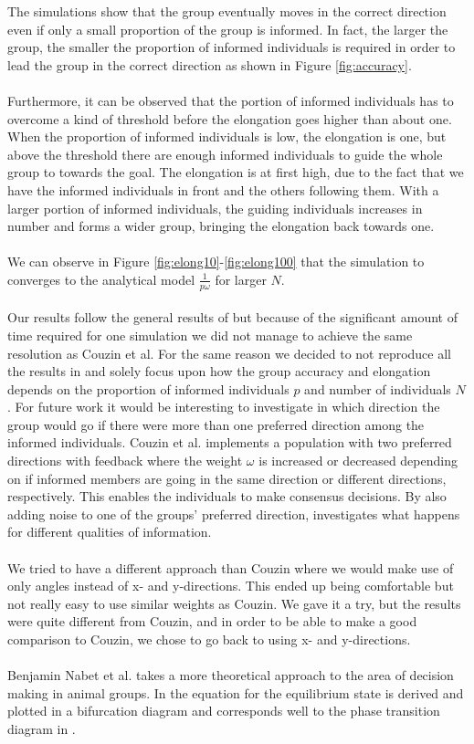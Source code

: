 The simulations show that the group eventually moves in the correct direction even if only a small proportion of the group is informed. 
In fact, the larger the group, the smaller the proportion of informed individuals is required in order to lead the group in the correct direction as shown in Figure \ref{fig:accuracy}.
\\\\
Furthermore, it can be observed that the portion of informed individuals has to overcome a kind of threshold before the elongation goes higher than about one. 
When the proportion of informed individuals is low, the elongation is one, but above the threshold there are enough informed individuals to guide the whole group to towards the goal. 
The elongation is at first high, due to the fact that we have the informed individuals in front and the others following them. 
With a larger portion of informed individuals, the guiding individuals increases in number and forms a wider group, bringing the elongation back towards one.
\\\\
We can observe in Figure \ref{fig:elong10}-\ref{fig:elong100} that the simulation to converges to the analytical model $\frac{1}{p\omega}$ for larger $N$.
\\\\
Our results follow the general results of \cite{theArticle} but because of the significant amount of time required for one simulation we did not manage to achieve the same resolution as Couzin et al. For the same reason we decided to not reproduce all the results in \cite{theArticle} and solely focus upon how the group accuracy and elongation depends on the proportion of informed individuals $p$ and number of individuals $N$. For future work it would be interesting to investigate in which direction the group would go if there were more than one preferred direction among the informed individuals. Couzin et al. implements a population with two preferred directions with feedback where the weight $\omega$ is increased or decreased depending on if informed members are going in the same direction or different directions, respectively. This enables the individuals to make consensus decisions. By also adding noise to one of the groups' preferred direction, \cite{theArticle} investigates what happens for different qualities of information.
\\\\
We tried to have a different approach than Couzin where we would make use of only angles instead of x- and y-directions. 
This ended up being comfortable but not really easy to use similar weights as Couzin. 
We gave it a try, but the results were quite different from Couzin, and in order to be able to make a good comparison to Couzin, we chose to go back to using x- and y-directions.
\\\\
Benjamin Nabet et al. takes a more theoretical approach to the area of decision making in animal groups. In \cite{anArticle} the equation for the equilibrium state is derived and plotted in a bifurcation diagram and corresponds well to the phase transition diagram in \cite{theArticle}.
